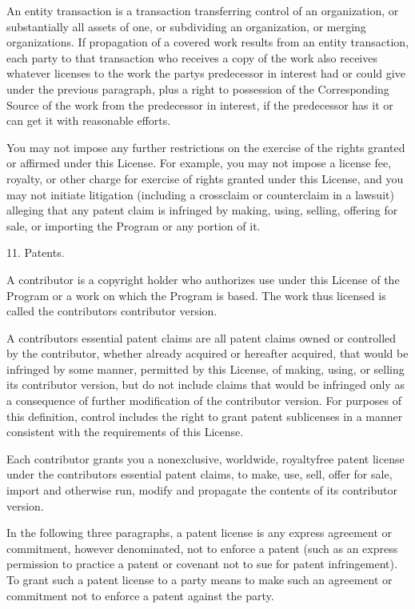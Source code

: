 \documentclass[a4paper,10pt,english]{sphinxmanual}
\begin{document}
\begin{sphinxVerbatim}[commandchars=\\\{\}]
  An \PYGZdq{}entity transaction\PYGZdq{} is a transaction transferring control of an
organization, or substantially all assets of one, or subdividing an
organization, or merging organizations.  If propagation of a covered
work results from an entity transaction, each party to that
transaction who receives a copy of the work also receives whatever
licenses to the work the party\PYGZsq{}s predecessor in interest had or could
give under the previous paragraph, plus a right to possession of the
Corresponding Source of the work from the predecessor in interest, if
the predecessor has it or can get it with reasonable efforts.

  You may not impose any further restrictions on the exercise of the
rights granted or affirmed under this License.  For example, you may
not impose a license fee, royalty, or other charge for exercise of
rights granted under this License, and you may not initiate litigation
(including a cross\PYGZhy{}claim or counterclaim in a lawsuit) alleging that
any patent claim is infringed by making, using, selling, offering for
sale, or importing the Program or any portion of it.

  11. Patents.

  A \PYGZdq{}contributor\PYGZdq{} is a copyright holder who authorizes use under this
License of the Program or a work on which the Program is based.  The
work thus licensed is called the contributor\PYGZsq{}s \PYGZdq{}contributor version\PYGZdq{}.

  A contributor\PYGZsq{}s \PYGZdq{}essential patent claims\PYGZdq{} are all patent claims
owned or controlled by the contributor, whether already acquired or
hereafter acquired, that would be infringed by some manner, permitted
by this License, of making, using, or selling its contributor version,
but do not include claims that would be infringed only as a
consequence of further modification of the contributor version.  For
purposes of this definition, \PYGZdq{}control\PYGZdq{} includes the right to grant
patent sublicenses in a manner consistent with the requirements of
this License.

  Each contributor grants you a non\PYGZhy{}exclusive, worldwide, royalty\PYGZhy{}free
patent license under the contributor\PYGZsq{}s essential patent claims, to
make, use, sell, offer for sale, import and otherwise run, modify and
propagate the contents of its contributor version.

  In the following three paragraphs, a \PYGZdq{}patent license\PYGZdq{} is any express
agreement or commitment, however denominated, not to enforce a patent
(such as an express permission to practice a patent or covenant not to
sue for patent infringement).  To \PYGZdq{}grant\PYGZdq{} such a patent license to a
party means to make such an agreement or commitment not to enforce a
patent against the party.


\end{sphinxVerbatim}
\end{document}
